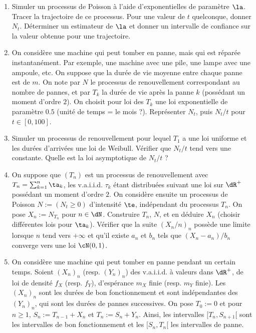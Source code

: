 {{\begin{enumerate} 
\item Simuler un processus de Poisson à l'aide d'exponentielles de
  paramètre $\la$. Tracer la trajectoire de ce processus. Pour une
  valeur de $t$ quelconque, donner $N_t$. Déterminer un estimateur de
  $\la$ et donner un intervalle de confiance sur la valeur obtenue
  pour une trajectoire.
\item On considère une machine qui peut tomber en panne, mais qui est
  réparée instantanément. Par exemple, une machine avec une pile, une
  lampe avec une ampoule, etc. On suppose que la durée de vie moyenne
  entre chaque panne est de $m$. On note par $N$ le processus de
  renouvellement correspondant au nombre de pannes, et par $T_k$ la
  durée de vie après la panne $k$ (possédant un moment d'ordre $2$).
  On choisit pour loi des $T_k$ une loi exponentielle de paramètre
  $0.5$ (unité de temps = le mois ?). Représenter $N_t$, puis $N_t/t$
  pour $t \in [0,100]$.
\item Simuler un processus de renouvellement pour lequel $T_1$ a une
  loi uniforme et les durées d'arrivées une loi de Weibull. Vérifier
  que $N_t/t$ tend vers une constante. Quelle est la loi asymptotique
  de $N_t/t$ ?
\item On suppose que $(T_n)$ est un processus de renouvellement avec
  $T_n=\sum_{k=1}^n \ta_k$, les v.a.i.i.d. $\tau_k$ étant distribuées
  suivant une loi sur $\dR^+$ possédant un moment d'ordre $2$. On
  considère ensuite un processus de Poisson $N:=(N_t\geq 0)$
  d'intensité $\te$, indépendant du processus $T_n$. On pose
  $X_n:=N_{T_n}$ pour $n\in\dN$. Construire $T_n$, $N$, et en déduire
  $X_n$ (choisir différentes lois pour $\ta_k$).  Vérifier que la
  suite $(X_n/n)_n$ possède une limite lorsque $n$ tend vers $+\infty$
  et qu'il existe $a_n$ et $b_n$ tels que $(X_n-a_n)/b_n$ converge
  vers une loi ${\cN}(0,1)$.
\item On considère une machine qui peut tomber en panne pendant un
  certain temps. Soient $(X_n)_n$ (resp. $(Y_n)_n$) des v.a.i.i.d. à
  valeurs dans $\dR^+$, de loi de densité $f_X$ (resp. $f_Y$),
  d'espérance $m_X$ finie (resp. $m_Y$ finie). Les $(X_n)_n$ sont les
  durées de bon fonctionnement et sont indépendantes des $(Y_n)_n$,
  qui sont les durées de pannes successives.  On pose $T_0:=0$ et pour
  $n \geq 1$, $S_n:=T_{n-1}+X_n$ et $T_n:=S_n+Y_n$.  Ainsi, les
  intervalles $[T_n,S_{n+1}[$ sont les intervalles de bon
  fonctionnement et les $[S_n,T_n[$ les intervalles de panne.
  \begin{enumerate}

\end{enumerate}
\end{enumerate}}}
